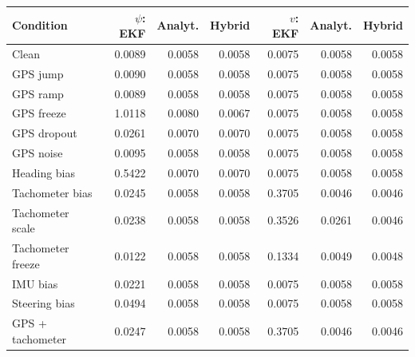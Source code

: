 \begin{tabular}{lrrrrrr}
\toprule
Condition & $\psi$: EKF & Analyt. & Hybrid & $v$: EKF & Analyt. & Hybrid \\
\midrule
Clean & 0.0089 & 0.0058 & 0.0058 & 0.0075 & 0.0058 & 0.0058 \\
GPS jump & 0.0090 & 0.0058 & 0.0058 & 0.0075 & 0.0058 & 0.0058 \\
GPS ramp & 0.0089 & 0.0058 & 0.0058 & 0.0075 & 0.0058 & 0.0058 \\
GPS freeze & 1.0118 & 0.0080 & 0.0067 & 0.0075 & 0.0058 & 0.0058 \\
GPS dropout & 0.0261 & 0.0070 & 0.0070 & 0.0075 & 0.0058 & 0.0058 \\
GPS noise & 0.0095 & 0.0058 & 0.0058 & 0.0075 & 0.0058 & 0.0058 \\
Heading bias & 0.5422 & 0.0070 & 0.0070 & 0.0075 & 0.0058 & 0.0058 \\
Tachometer bias & 0.0245 & 0.0058 & 0.0058 & 0.3705 & 0.0046 & 0.0046 \\
Tachometer scale & 0.0238 & 0.0058 & 0.0058 & 0.3526 & 0.0261 & 0.0046 \\
Tachometer freeze & 0.0122 & 0.0058 & 0.0058 & 0.1334 & 0.0049 & 0.0048 \\
IMU bias & 0.0221 & 0.0058 & 0.0058 & 0.0075 & 0.0058 & 0.0058 \\
Steering bias & 0.0494 & 0.0058 & 0.0058 & 0.0075 & 0.0058 & 0.0058 \\
GPS + tachometer & 0.0247 & 0.0058 & 0.0058 & 0.3705 & 0.0046 & 0.0046 \\
\bottomrule
\end{tabular}
